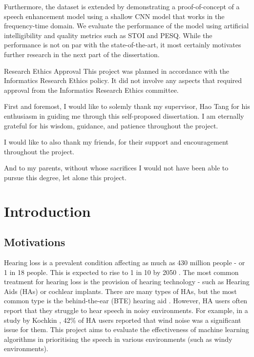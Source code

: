 \documentclass[logo,bsc,singlespacing,parskip,online]{infthesis}
\begin{document}
\begin{preliminary}
{   Furthermore, the dataset is extended by demonstrating a proof-of-concept of a speech enhancement model 
   using a shallow CNN model that works in the frequency-time domain. We evaluate the performance of the model 
   using artificial intelligibility and quality metrics such as STOI and PESQ. While the performance is not on par 
   with the state-of-the-art, it most certainly motivates further research in the next part of the dissertation.
}

\maketitle

\newenvironment{ethics}
   {\begin{frontenv}{Research Ethics Approval}{\LARGE}}
   {\end{frontenv}\newpage}

\begin{ethics}
This project was planned in accordance with the Informatics Research
Ethics policy. It did not involve any aspects that required approval
from the Informatics Research Ethics committee.

\standarddeclaration
\end{ethics}


\begin{acknowledgements}
First and foremost, I would like to solemly thank my supervisor, Hao Tang for 
his enthusiasm in guiding me through this self-proposed dissertation. I am eternally grateful for his wisdom, guidance, and patience throughout the project.

I would like to also thank my friends, for their support and encouragement throughout the project. 

And to my parents, without whose sacrifices I would not have been able to pursue this degree, let alone this project.
\end{acknowledgements}


\tableofcontents
\end{preliminary}


\chapter{Introduction}
\section{Motivations}
Hearing loss is a prevalent condition affecting as much as 
430 million people - or 1 in 18 people. This is expected 
to rise to 1 in 10 by 2050 \cite{WHO2024deafness}.
The most common treatment for hearing loss is the 
provision of hearing technology - such as Hearing Aids (HAs) or cochlear implants.
There are many types of HAs, but the most common
type is the behind-the-ear (BTE) hearing aid \cite{Kochkin2010MarkeTrak8}.
However, HA users often report that they struggle to hear speech
in noisy environments. For example, in a study by Kochkin \cite{Kochkin2010MarkeTrak8},
42\% of HA users reported that wind noise was a significant issue for them.
This project aims to evaluate the effectiveness of machine learning algorithms
in prioritising the speech in various environments (such as windy environments).
\end{document}
